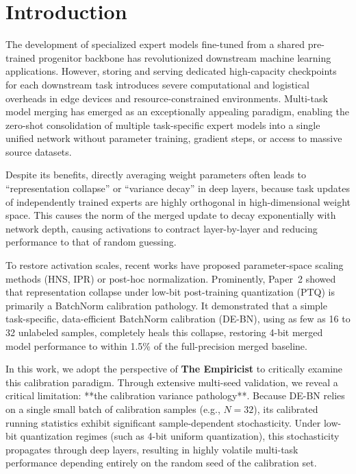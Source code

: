 \documentclass{article}
\begin{document}
\section{Introduction}
\label{submission-introduction}
The development of specialized expert models fine-tuned from a shared pre-trained progenitor backbone has revolutionized downstream machine learning applications. However, storing and serving dedicated high-capacity checkpoints for each downstream task introduces severe computational and logistical overheads in edge devices and resource-constrained environments. Multi-task model merging has emerged as an exceptionally appealing paradigm, enabling the zero-shot consolidation of multiple task-specific expert models into a single unified network without parameter training, gradient steps, or access to massive source datasets.

Despite its benefits, directly averaging weight parameters often leads to ``representation collapse'' or ``variance decay'' in deep layers, because task updates of independently trained experts are highly orthogonal in high-dimensional weight space. This causes the norm of the merged update to decay exponentially with network depth, causing activations to contract layer-by-layer and reducing performance to that of random guessing.

To restore activation scales, recent works have proposed parameter-space scaling methods (HNS, IPR) or post-hoc normalization. Prominently, Paper~2 showed that representation collapse under low-bit post-training quantization (PTQ) is primarily a BatchNorm calibration pathology. It demonstrated that a simple task-specific, data-efficient BatchNorm calibration (DE-BN), using as few as 16 to 32 unlabeled samples, completely heals this collapse, restoring 4-bit merged model performance to within 1.5\% of the full-precision merged baseline.

In this work, we adopt the perspective of \textbf{The Empiricist} to critically examine this calibration paradigm. Through extensive multi-seed validation, we reveal a critical limitation: **the calibration variance pathology**. Because DE-BN relies on a single small batch of calibration samples (e.g., $N=32$), its calibrated running statistics exhibit significant sample-dependent stochasticity. Under low-bit quantization regimes (such as 4-bit uniform quantization), this stochasticity propagates through deep layers, resulting in highly volatile multi-task performance depending entirely on the random seed of the calibration set.
\end{document}
